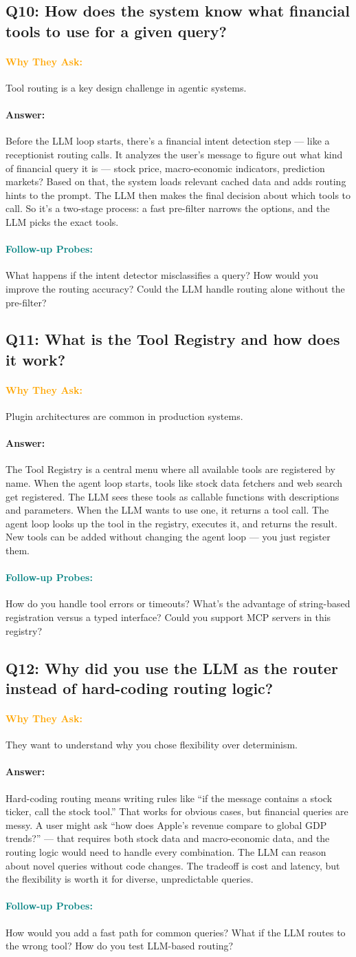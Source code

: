 \documentclass[11pt,a4paper]{article}
\newcommand{\Q}[1]{\subsection{#1}}
\newcommand{\Ans}[1]{\paragraph{\textbf{Answer:}} #1}
\newcommand{\Why}{\paragraph{\textcolor{orange}{\textbf{Why They Ask:}}}}
\newcommand{\Probe}{\paragraph{\textcolor{teal}{\textbf{Follow-up Probes:}}}}
\begin{document}
\Q{Q10: How does the system know what financial tools to use for a given query?}
\Why Tool routing is a key design challenge in agentic systems.
\Ans Before the LLM loop starts, there's a financial intent detection step --- like a receptionist routing calls. It analyzes the user's message to figure out what kind of financial query it is --- stock price, macro-economic indicators, prediction markets? Based on that, the system loads relevant cached data and adds routing hints to the prompt. The LLM then makes the final decision about which tools to call. So it's a two-stage process: a fast pre-filter narrows the options, and the LLM picks the exact tools.
\Probe What happens if the intent detector misclassifies a query? How would you improve the routing accuracy? Could the LLM handle routing alone without the pre-filter?

\Q{Q11: What is the Tool Registry and how does it work?}
\Why Plugin architectures are common in production systems.
\Ans The Tool Registry is a central menu where all available tools are registered by name. When the agent loop starts, tools like stock data fetchers and web search get registered. The LLM sees these tools as callable functions with descriptions and parameters. When the LLM wants to use one, it returns a tool call. The agent loop looks up the tool in the registry, executes it, and returns the result. New tools can be added without changing the agent loop --- you just register them.
\Probe How do you handle tool errors or timeouts? What's the advantage of string-based registration versus a typed interface? Could you support MCP servers in this registry?

\Q{Q12: Why did you use the LLM as the router instead of hard-coding routing logic?}
\Why They want to understand why you chose flexibility over determinism.
\Ans Hard-coding routing means writing rules like ``if the message contains a stock ticker, call the stock tool.'' That works for obvious cases, but financial queries are messy. A user might ask ``how does Apple's revenue compare to global GDP trends?'' --- that requires both stock data and macro-economic data, and the routing logic would need to handle every combination. The LLM can reason about novel queries without code changes. The tradeoff is cost and latency, but the flexibility is worth it for diverse, unpredictable queries.
\Probe How would you add a fast path for common queries? What if the LLM routes to the wrong tool? How do you test LLM-based routing?
\end{document}
